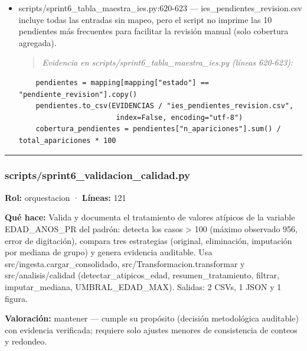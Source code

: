 \begin{itemize}
  \item scripts/sprint6\_tabla\_maestra\_ies.py:620-623 --- ies\_pendientes\_revision.csv incluye todas las entradas sin mapeo, pero el script no imprime las 10 pendientes más frecuentes para facilitar la revisión manual (solo cobertura agregada).
\begin{quote}\footnotesize\ttfamily
\noindent\emph{Evidencia en scripts/sprint6\_tabla\_maestra\_ies.py (líneas 620-623):}
\end{quote}
\begin{lstlisting}
    pendientes = mapping[mapping["estado"] == "pendiente_revision"].copy()
    pendientes.to_csv(EVIDENCIAS / "ies_pendientes_revision.csv",
                       index=False, encoding="utf-8")
    cobertura_pendientes = pendientes["n_apariciones"].sum() / total_apariciones * 100
\end{lstlisting}

\end{itemize}

\medskip
\hrule

\subsubsection{scripts/sprint6\_validacion\_calidad.py}
\textbf{Rol:} orquestacion · \textbf{Líneas:} 121

\textbf{Qué hace:} Valida y documenta el tratamiento de valores atípicos de la variable EDAD\_ANOS\_PR del padrón: detecta los casos > 100 (máximo observado 956, error de digitación), compara tres estrategias (original, eliminación, imputación por mediana de grupo) y genera evidencia auditable. Usa src/ingesta.cargar\_consolidado, src/Transformacion.transformar y src/analisis/calidad (detectar\_atipicos\_edad, resumen\_tratamiento, filtrar, imputar\_mediana, UMBRAL\_EDAD\_MAX). Salidas: 2 CSVs, 1 JSON y 1 figura.

\textbf{Valoración:} mantener --- cumple su propósito (decisión metodológica auditable) con evidencia verificada; requiere solo ajustes menores de consistencia de conteos y redondeo.

